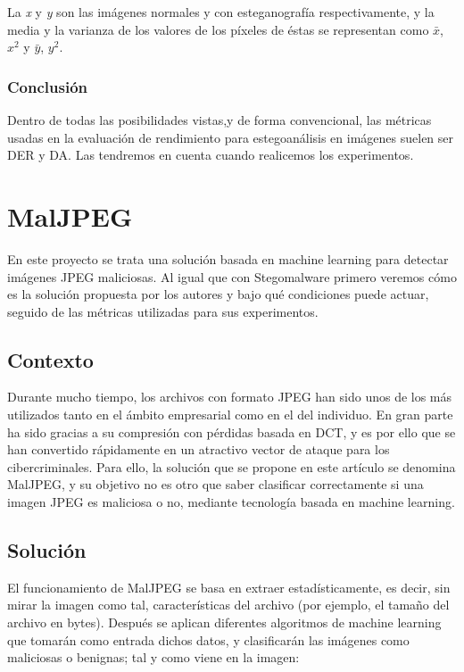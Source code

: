 
La \textit{x} y \textit{y} son las imágenes normales y con esteganografía respectivamente, y la media y la varianza de los valores de los píxeles de éstas se representan como \textit{$\bar{x}$}, \textit{$x^{2}$} y \textit{$\bar{y}$}, \textit{$y^{2}$}.%

\subsubsection{Conclusión}

Dentro de todas las posibilidades vistas,y de forma convencional, las métricas usadas en la evaluación de rendimiento para estegoanálisis en imágenes suelen ser \ac{DER} y \ac{DA}. Las tendremos en cuenta cuando realicemos los experimentos.

\section{MalJPEG}

En este proyecto se trata una solución basada en machine learning para detectar imágenes JPEG maliciosas. Al igual que con Stegomalware primero veremos cómo es la solución propuesta por los autores y bajo qué condiciones puede actuar, seguido de las métricas utilizadas para sus experimentos.

\subsection{Contexto}

Durante mucho tiempo, los archivos con formato JPEG han sido unos de los más utilizados tanto en el ámbito empresarial como en el del individuo. En gran parte ha sido gracias a su compresión con pérdidas basada en \ac{DCT}, y es por ello que se han convertido rápidamente en un atractivo vector de ataque para los cibercriminales. Para ello, la solución que se propone en este artículo se denomina MalJPEG, y su objetivo no es otro que saber clasificar correctamente si una imagen JPEG es maliciosa o no, mediante tecnología basada en machine learning.

\subsection{Solución}

El funcionamiento de MalJPEG se basa en extraer estadísticamente, es decir, sin mirar la imagen como tal, características del archivo (por ejemplo, el tamaño del archivo en bytes). Después se aplican diferentes algoritmos de machine learning que tomarán como entrada dichos datos, y clasificarán las imágenes como maliciosas o benignas; tal y como viene en la imagen:

